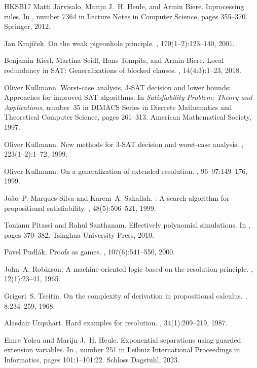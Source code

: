\documentclass[12pt]{article}
\begin{document}
\begin{thebibliography}{HKSB17}
  Matti J{\"a}rvisalo, Marijn J.~H. Heule, and Armin Biere.
  \newblock Inprocessing rules.
  \newblock In {\em {}}, number 7364 in Lecture Notes in Computer Science,
  pages 355--370. Springer, 2012.

  Jan Kraj{\'i}{\v c}ek.
  \newblock On the weak pigeonhole principle.
  , 170(1--2):123--140, 2001.

  Benjamin Kiesl, Martina Seidl, Hans Tompits, and Armin Biere.
  \newblock Local redundancy in {SAT}: Generalizations of blocked clauses.
  , 14(4:3):1--23, 2018.

  Oliver Kullmann.
  \newblock Worst-case analysis, {3-SAT} decision and lower bounds: Approaches
  for improved {SAT} algorithms.
  \newblock In {\em Satisfiability Problem: Theory and Applications}, number~35
  in DIMACS Series in Discrete Mathematics and Theoretical Computer Science,
  pages 261--313. American Mathematical Society, 1997.

  Oliver Kullmann.
  \newblock New methods for {3-SAT} decision and worst-case analysis.
  , 223(1--2):1--72, 1999.

  Oliver Kullmann.
  \newblock On a generalization of extended resolution.
  , 96--97:149--176, 1999.

  Jo{\~a}o~P. {Marques-Silva} and Karem~A. Sakallah.
  : A search algorithm for propositional satisfiability.
  , 48(5):506--521, 1999.

  Toniann Pitassi and Rahul Santhanam.
  \newblock Effectively polynomial simulations.
  \newblock In {\em {}}, pages 370--382. Tsinghua University Press, 2010.

  Pavel Pudl{\'a}k.
  \newblock Proofs as games.
  , 107(6):541--550, 2000.

  John~A. Robinson.
  \newblock A machine-oriented logic based on the resolution principle.
  , 12(1):23--41, 1965.

  Grigori~S. Tseitin.
  \newblock On the complexity of derivation in propositional calculus.
  , 8:234--259, 1968.

  Alasdair Urquhart.
  \newblock Hard examples for resolution.
  , 34(1):209--219, 1987.

  Emre Yolcu and Marijn J.~H. Heule.
  \newblock Exponential separations using guarded extension variables.
  \newblock In {\em {}}, number 251 in Leibniz International Proceedings
  in Informatics, pages 101:1--101:22. Schloss Dagstuhl, 2023.

\end{thebibliography}
\end{document}
